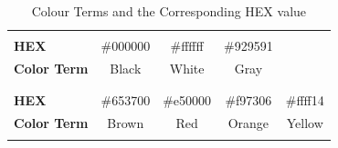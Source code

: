 \begin{table}[!ht]\centering
\caption{Colour Terms and the Corresponding HEX value}
\begin{tabular}{lcccc}
\cline{2-4}
\multicolumn{1}{l|}{}                     & \multicolumn{1}{l|}{\cellcolor[HTML]{000000}} & \multicolumn{1}{l|}{\cellcolor[HTML]{FFFFFF}} & \multicolumn{1}{l|}{\cellcolor[HTML]{929591}} &                                               \\ \cline{1-4}
\multicolumn{1}{|l|}{\textbf{HEX}}        & \multicolumn{1}{c|}{\#000000}                 & \multicolumn{1}{c|}{\#ffffff}                 & \multicolumn{1}{c|}{\#929591}                 &                                               \\ \cline{1-4}
\multicolumn{1}{|l|}{\textbf{Color Term}} & \multicolumn{1}{c|}{Black}                    & \multicolumn{1}{c|}{White}                    & \multicolumn{1}{c|}{Gray}                     &                                               \\ \cline{1-4}
                                          & \multicolumn{1}{l}{}                          & \multicolumn{1}{l}{}                          & \multicolumn{1}{l}{}                          &                                               \\ \cline{2-5}
\multicolumn{1}{l|}{}                     & \multicolumn{1}{l|}{\cellcolor[HTML]{653700}} & \multicolumn{1}{l|}{\cellcolor[HTML]{E50000}} & \multicolumn{1}{l|}{\cellcolor[HTML]{F97306}} & \multicolumn{1}{l|}{\cellcolor[HTML]{FFFF14}} \\ \hline
\multicolumn{1}{|l|}{\textbf{HEX}}        & \multicolumn{1}{c|}{\#653700}                 & \multicolumn{1}{c|}{\#e50000}                 & \multicolumn{1}{c|}{\#f97306}                 & \multicolumn{1}{c|}{\#ffff14}                 \\ \hline
\multicolumn{1}{|l|}{\textbf{Color Term}} & \multicolumn{1}{c|}{Brown}                    & \multicolumn{1}{c|}{Red}                      & \multicolumn{1}{c|}{Orange}                   & \multicolumn{1}{c|}{Yellow}                   \\ \hline
                                          & \multicolumn{1}{l}{}                          & \multicolumn{1}{l}{}                          & \multicolumn{1}{l}{}                          &                                               \\ \cline{2-5}

\end{tabular}
\end{table}
